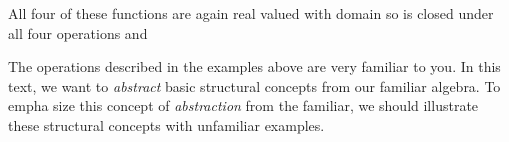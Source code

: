\documentclass[11pt,oneside]{article}
\begin{document}
\begin{BookBody}
\noindent All four of these functions are again real valued with domain  so  is closed under all four operations \BookInline{+,\allowbreak -,\allowbreak \cdot,\allowbreak } and \BookEnd{\blacktriangle}

The operations described in the examples above are very familiar to you. In this text, we want to\textit{ abstract} basic structural concepts from our familiar algebra. To empha
size this concept of\textit{ abstraction} from the familiar, we should illustrate these structural concepts with unfamiliar examples.

\end{BookBody}

\BookNarrativetrue
\end{document}
